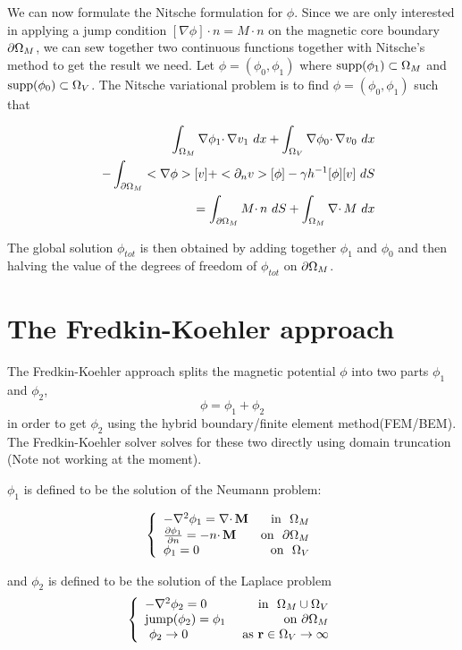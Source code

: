 \documentclass[12pt,a4paper,notitlepage]{article}
\begin{document}
We can now formulate the Nitsche formulation for $\phi$. Since we are only interested in applying a jump condition
$ [\nabla \phi]  \cdotp n =  M \cdotp n $ on the magnetic core boundary $\partial \Omega_M$, we can sew together two continuous functions
together with Nitsche's method to get the result we need. Let $\phi = (\phi_0,\phi_1)$ where
$\operatorname{supp}(\phi_1) \subset \Omega_M$ and $\operatorname{supp}(\phi_0) \subset \Omega_V$. The Nitsche variational problem is to find  $\phi = (\phi_0,\phi_1)$ such that

\begin{eqnarray*}
&&\int_{\Omega_M} \nabla \phi_1 \cdotp \nabla v_1 \ dx + \int_{\Omega_V} \nabla \phi_0 \cdotp \nabla v_0 \ dx \\
&&- \int_{\partial \Omega_M} <\nabla \phi> [v]  + <\partial_n v> [\phi] - \gamma h^{-1} [\phi][v] \ dS \\
&&= \int_{\partial \Omega_M} M  \cdotp n \ dS + \int_{\Omega_M} \nabla \cdotp M \ dx
\end{eqnarray*}

The global solution $\phi_{tot}$ is then obtained by adding together $\phi_1$ and $\phi_0$ and then halving the value
of the degrees of freedom of $\phi_{tot}$ on $\partial \Omega_M$.


\section{The Fredkin-Koehler approach} 
The Fredkin-Koehler approach splits the magnetic potential $\phi$ into two parts $\phi_1$ and $\phi_2$, 
\[ \phi = \phi_1 + \phi_2 \]
\noindent in order to get $\phi_2$ using the hybrid boundary/finite element method(FEM/BEM).
The Fredkin-Koehler solver solves for these two directly using domain truncation (Note not working at the moment).

\noindent $\phi_1$ is defined to be the solution of the Neumann problem:

\[ 
\left\{
\begin{array}{lr}
- \nabla^2 \phi_1 = \nabla \cdotp \mathbf{M}  & \mbox{in } \ \Omega_M \\
 \frac{\partial \phi_1}{\partial n}  = -n \cdotp \mathbf{M} & \mbox{on } \  \partial \Omega_M \\
 \phi_1 = 0 & \mbox{on} \ \ \Omega_V
\end{array}
\right. 
\]


\noindent and $\phi_2$ is defined to be the solution of the Laplace problem
\[ 
\left\{
\begin{array}{lr}
- \nabla^2 \phi_2 = 0 & \mbox{in } \ \Omega_M \cup \Omega_V \\
\mbox{jump}(\phi_2) = \phi_1 & \mbox{on} \ \partial \Omega_M \\
\ \phi_2 \rightarrow 0 & \ \mbox{as} \ \mathbf{r} \in \Omega_V \rightarrow \infty
\end{array}
\right. 
\]
\end{document}
